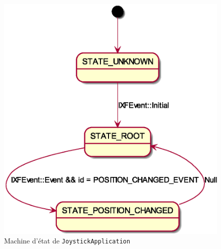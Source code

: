 \documentclass[DeseNET_Sebastien_Deriaz]{subfiles}
\begin{document}
\begin{figure}[H]
\centering
\includegraphics[scale=0.5]{out/SM.eps}
\caption{Machine d'état de \texttt{JoystickApplication}}
\end{figure}
\end{document}
